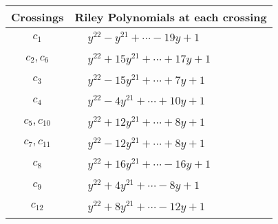 \documentclass[1p]{elsarticle_modified}
\theoremstyle{definition}
\begin{document}
\begin{tabular}{m{50pt}|m{274pt}}
Crossings & \hspace{64pt}Riley Polynomials at each crossing \\
\hline $$\begin{aligned}c_{1}\end{aligned}$$&$\begin{aligned}
&y^{22}- y^{21}+\cdots-19 y+1
\end{aligned}$\\
\hline $$\begin{aligned}c_{2},c_{6}\end{aligned}$$&$\begin{aligned}
&y^{22}+15 y^{21}+\cdots+17 y+1
\end{aligned}$\\
\hline $$\begin{aligned}c_{3}\end{aligned}$$&$\begin{aligned}
&y^{22}-15 y^{21}+\cdots+7 y+1
\end{aligned}$\\
\hline $$\begin{aligned}c_{4}\end{aligned}$$&$\begin{aligned}
&y^{22}-4 y^{21}+\cdots+10 y+1
\end{aligned}$\\
\hline $$\begin{aligned}c_{5},c_{10}\end{aligned}$$&$\begin{aligned}
&y^{22}+12 y^{21}+\cdots+8 y+1
\end{aligned}$\\
\hline $$\begin{aligned}c_{7},c_{11}\end{aligned}$$&$\begin{aligned}
&y^{22}-12 y^{21}+\cdots+8 y+1
\end{aligned}$\\
\hline $$\begin{aligned}c_{8}\end{aligned}$$&$\begin{aligned}
&y^{22}+16 y^{21}+\cdots-16 y+1
\end{aligned}$\\
\hline $$\begin{aligned}c_{9}\end{aligned}$$&$\begin{aligned}
&y^{22}+4 y^{21}+\cdots-8 y+1
\end{aligned}$\\
\hline $$\begin{aligned}c_{12}\end{aligned}$$&$\begin{aligned}
&y^{22}+8 y^{21}+\cdots-12 y+1
\end{aligned}$\\
\hline
\end{tabular}\\~\\
\end{document}
